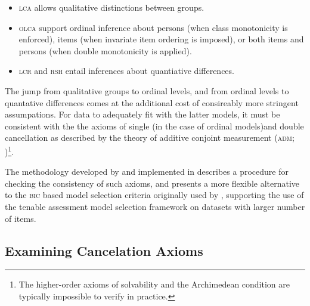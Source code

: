 \documentclass[12pt]{article}
\begin{document}
\begin{itemize}
	\item \textsc{lca} allows qualitative distinctions between groups.
	\item \textsc{olca} support ordinal inference about persons (when class monotonicity is enforced), items (when invariate item ordering is imposed), or both items and persons (when double monotonicity is applied).
	\item \textsc{lcr} and \textsc{rsh} entail inferences about quantiative differences.
\end{itemize}

The jump from qualitative groups to ordinal levels, and from ordinal levels to quantative differences comes at the additional cost of consireably more stringent assumpations. For data to adequately fit with the latter models, it must be consistent with the the axioms of single (in the case of ordinal models)and double cancellation as described by the theory of additive conjoint measurement (\textsc{adm}; )\footnote{The higher-order axioms of solvability and the Archimedean condition are typically impossible to verify in practice.}.

The methodology developed by  and implemented in  describes a procedure for checking the consistency of such axioms, and presents a more flexible alternative to the \textsc{bic} based model selection criteria originally used by , supporting the use of the tenable assessment model selection framework on datasets with larger number of items.

\subsection{Examining Cancelation Axioms}
\end{document}
